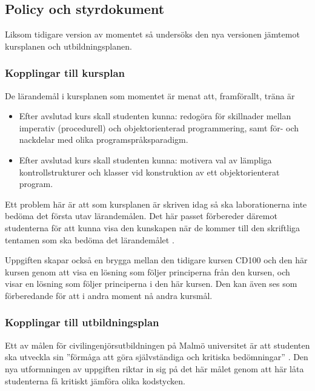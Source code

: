 \documentclass[a4paper, 10pt]{article}
\begin{document}
\subsection{Policy och styrdokument}

Liksom tidigare version av momentet så undersöks 
den nya versionen jämtemot kursplanen och 
utbildningsplanen.

\subsubsection{Kopplingar till kursplan}

De lärandemål i kursplanen som momentet är menat 
att, framförallt, träna är 

\begin{itemize}
    \item Efter avslutad kurs skall studenten kunna: 
    redogöra för skillnader mellan 
    imperativ (procedurell) och objektorienterad 
    programmering, samt för- och nackdelar med 
    olika programspråksparadigm.
    \item Efter avslutad kurs skall studenten kunna:
    motivera val av lämpliga kontrollstrukturer 
    och klasser vid konstruktion av ett 
    objektorienterat program.
\end{itemize}

Ett problem här är att som kursplanen är 
skriven idag så ska laborationerna inte bedöma 
det första utav lärandemålen. Det här passet 
förbereder däremot studenterna för att kunna 
visa den kunskapen när de kommer till den 
skriftliga tentamen som ska bedöma det 
lärandemålet \parencite{cd102a2025}.

Uppgiften skapar också en brygga mellan den 
tidigare kursen CD100 och den här kursen genom 
att visa en lösning som följer principerna från 
den kursen, och visar en lösning som följer 
principerna i den här kursen. Den kan även ses 
som förberedande för att i andra moment nå andra 
kursmål.

\subsubsection{Kopplingar till utbildningsplan}

Ett av målen för civilingenjörsutbildningen 
på Malmö universitet är att studenten ska 
utveckla sin ''förmåga att göra självständiga 
och kritiska bedömningar'' \parencite{tcdat2025}. 
Den nya utformningen av uppgiften riktar in 
sig på det här målet genom att här låta 
studenterna få kritiskt jämföra olika 
kodstycken. 
\end{document}

